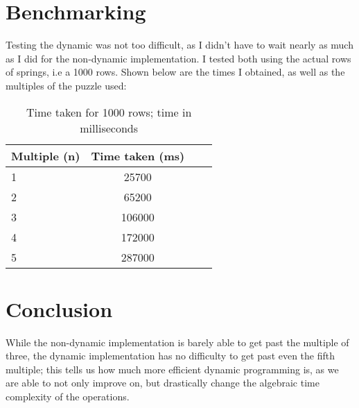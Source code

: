 \documentclass[a4paper,11pt]{article}
\begin{document}
\section*{Benchmarking}
Testing the dynamic was not too difficult, as I didn't have to wait nearly as much as I did for the non-dynamic implementation. I tested both using the actual rows of springs, i.e a 1000 rows. Shown below are the times I obtained, as well as the multiples of the puzzle used:
\begin{table}[h]
\begin{center}
\begin{tabular}{l|c|c|c}
\textbf{Multiple (n)} & \textbf{Time taken (ms)}\\
\hline
  1     &  25700\\
  2     &  65200\\
  3     &  106000\\
  4     &  172000\\
  5     &  287000\\
\end{tabular}
\caption{Time taken for 1000 rows; time in milliseconds}
\label{tab:table}
\end{center}
\end{table}

\section*{Conclusion}
While the non-dynamic implementation is barely able to get past the multiple of three, the dynamic implementation has no difficulty to get past even the fifth multiple; this tells us how much more efficient dynamic programming is, as we are able to not only improve on, but drastically change the algebraic time complexity of the operations. 
\end{document}
